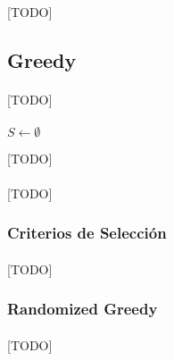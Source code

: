\documentclass{subfiles}
\begin{document}
        \paragraph{}
        [TODO]

      \subsection{Greedy}
      \label{sec:solving_greedy}

        \paragraph{}
        [TODO]


        \paragraph{}
        \begin{algorithm}
          \SetAlgoLined
          $S \gets \emptyset$\;
          \caption{[TODO]}
          \label{code:solving_greedy}
        \end{algorithm}


        \paragraph{}
        [TODO]

        \subsubsection{Criterios de Selección}
        \label{sec:solving_greedy_criterions}

          \paragraph{}
          [TODO]

        \subsubsection{Randomized Greedy}
        \label{sec:solving_randomized_greedy}

          \paragraph{}
          [TODO]
\end{document}
